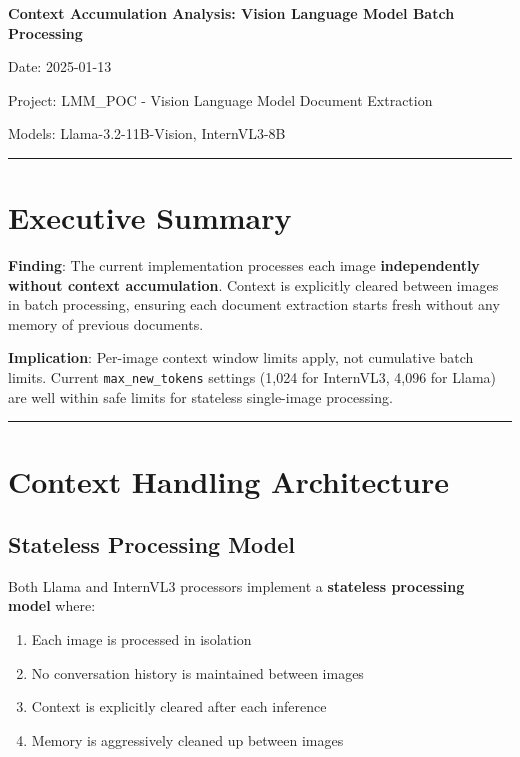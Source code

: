 \documentclass[11pt,a4paper]{article}
\begin{document}
\begin{center}
{\LARGE\bfseries Context Accumulation Analysis: Vision Language Model Batch Processing}

\vspace{0.5cm}

{\large Date: 2025-01-13}

{\large Project: LMM\_POC - Vision Language Model Document Extraction}

{\large Models: Llama-3.2-11B-Vision, InternVL3-8B}
\end{center}

\vspace{0.5cm}
\hrule
\vspace{0.5cm}

\section*{Executive Summary}

\textbf{Finding}: The current implementation processes each image \textbf{independently without context accumulation}. Context is explicitly cleared between images in batch processing, ensuring each document extraction starts fresh without any memory of previous documents.

\textbf{Implication}: Per-image context window limits apply, not cumulative batch limits. Current \texttt{max\_new\_tokens} settings (1,024 for InternVL3, 4,096 for Llama) are well within safe limits for stateless single-image processing.

\vspace{0.3cm}
\hrule
\vspace{0.5cm}

\tableofcontents

\newpage

\section{Context Handling Architecture}

\subsection{Stateless Processing Model}

Both Llama and InternVL3 processors implement a \textbf{stateless processing model} where:

\begin{enumerate}[leftmargin=*]
    \item Each image is processed in isolation
    \item No conversation history is maintained between images
    \item Context is explicitly cleared after each inference
    \item Memory is aggressively cleaned up between images
\end{enumerate}
\end{document}
